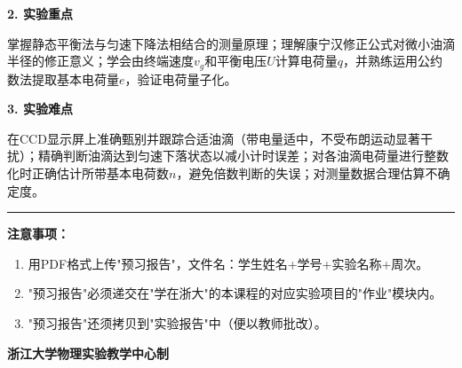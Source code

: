 \documentclass[a4paper,12pt]{article}
\begin{document}
\vspace{0.5cm}

{\fontsize{14pt}{20pt}\selectfont \textbf{2. 实验重点}}

\vspace{0.3cm}

{\fontsize{12pt}{18pt}\selectfont

掌握静态平衡法与匀速下降法相结合的测量原理；理解康宁汉修正公式对微小油滴半径的修正意义；学会由终端速度$v_g$和平衡电压$U$计算电荷量$q$，并熟练运用公约数法提取基本电荷量$e$，验证电荷量子化。

}

\vspace{0.5cm}

{\fontsize{14pt}{20pt}\selectfont \textbf{3. 实验难点}}

\vspace{0.3cm}

{\fontsize{12pt}{18pt}\selectfont

在CCD显示屏上准确甄别并跟踪合适油滴（带电量适中，不受布朗运动显著干扰）；精确判断油滴达到匀速下落状态以减小计时误差；对各油滴电荷量进行整数化时正确估计所带基本电荷数$n$，避免倍数判断的失误；对测量数据合理估算不确定度。

}

\vfill

\noindent\rule{\textwidth}{0.4pt}

{\fontsize{12pt}{18pt}\selectfont
\textbf{注意事项：}
\begin{enumerate}[label=\arabic*., leftmargin=2em, nosep]
    \item 用PDF格式上传"预习报告"，文件名：学生姓名+学号+实验名称+周次。
    \item "预习报告"必须递交在"学在浙大"的本课程的对应实验项目的"作业"模块内。
    \item "预习报告"还须拷贝到"实验报告"中（便以教师批改）。
\end{enumerate}
}

\vspace{0.5cm}
\begin{center}
    {\fontsize{12pt}{18pt}\selectfont \textbf{浙江大学物理实验教学中心制}}
\end{center}
\end{document}
